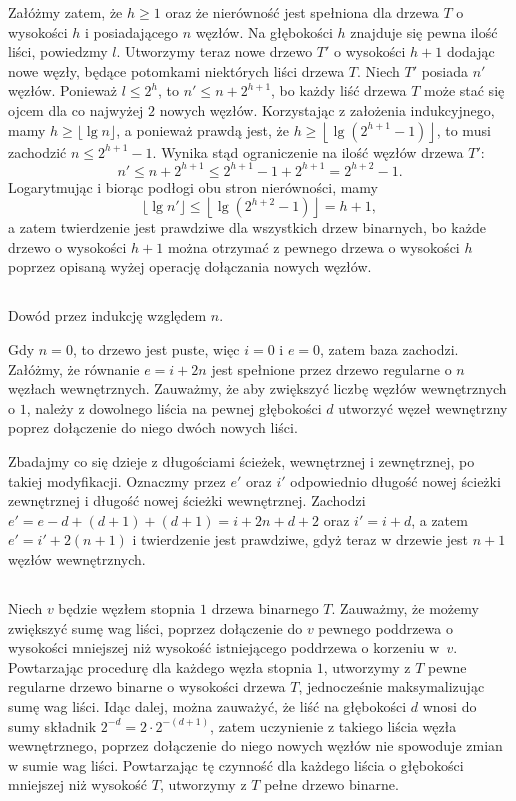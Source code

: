 Załóżmy zatem, że $h\ge 1$ oraz że nierówność jest spełniona dla drzewa $T$ o wysokości $h$ i posiadającego $n$ węzłów. Na głębokości $h$ znajduje się pewna ilość liści, powiedzmy $l$. Utworzymy teraz nowe drzewo $T'$ o wysokości $h+1$ dodając nowe węzły, będące potomkami niektórych liści drzewa $T$. Niech $T'$ posiada $n'$ węzłów. Ponieważ $l\le2^h$, to $n'\le n+2^{h+1}$, bo każdy liść drzewa $T$ może stać się ojcem dla co najwyżej $2$ nowych węzłów. Korzystając z założenia indukcyjnego, mamy $h\ge\lfloor\lg n\rfloor$, a ponieważ prawdą jest, że $h\ge\left\lfloor\lg\left(2^{h+1}-1\right)\right\rfloor$, to musi zachodzić $n\le 2^{h+1}-1$. Wynika stąd ograniczenie na ilość węzłów drzewa $T'$:
\[
	n'\le n+2^{h+1}\le 2^{h+1}-1+2^{h+1} = 2^{h+2}-1.
\]
Logarytmując i biorąc podłogi obu stron nierówności, mamy
\[
	\lfloor\lg n'\rfloor\le\left\lfloor\lg\left(2^{h+2}-1\right)\right\rfloor = h+1,
\]
a zatem twierdzenie jest prawdziwe dla wszystkich drzew binarnych, bo każde drzewo o wysokości $h+1$ można otrzymać z pewnego drzewa o wysokości $h$ poprzez opisaną wyżej operację dołączania nowych węzłów.

\subsection{} %
Dowód przez indukcję względem $n$.

Gdy $n=0$, to drzewo jest puste, więc $i=0$ i $e=0$, zatem baza zachodzi. Załóżmy, że równanie $e=i+2n$ jest spełnione przez drzewo regularne o $n$ węzłach wewnętrznych. Zauważmy, że aby zwiększyć liczbę węzłów wewnętrznych o $1$, należy z dowolnego liścia na pewnej głębokości $d$ utworzyć węzeł wewnętrzny poprez dołączenie do niego dwóch nowych liści.

Zbadajmy co się dzieje z długościami ścieżek, wewnętrznej i zewnętrznej, po takiej modyfikacji. Oznaczmy przez $e'$ oraz $i'$ odpowiednio długość nowej ścieżki zewnętrznej i długość nowej ścieżki wewnętrznej. Zachodzi $e'=e-d+(d+1)+(d+1)=i+2n+d+2$ oraz $i'=i+d$, a zatem $e'=i'+2(n+1)$ i twierdzenie jest prawdziwe, gdyż teraz w drzewie jest $n+1$ węzłów wewnętrznych.

\subsection{} %
Niech $v$ będzie węzłem stopnia $1$ drzewa binarnego $T$. Zauważmy, że możemy zwiększyć sumę wag liści, poprzez dołączenie do $v$ pewnego poddrzewa o wysokości mniejszej niż wysokość istniejącego poddrzewa o korzeniu w~$v$. Powtarzając procedurę dla każdego węzła stopnia $1$, utworzymy z $T$ pewne regularne drzewo binarne o wysokości drzewa $T$, jednocześnie maksymalizując sumę wag liści. Idąc dalej, można zauważyć, że liść na głębokości $d$ wnosi do sumy składnik $2^{-d}=2\cdot 2^{-(d+1)}$, zatem uczynienie z takiego liścia węzła wewnętrznego, poprzez dołączenie do niego nowych węzłów nie spowoduje zmian w sumie wag liści. Powtarzając tę czynność dla każdego liścia o głębokości mniejszej niż wysokość $T$, utworzymy z $T$ pełne drzewo binarne.


